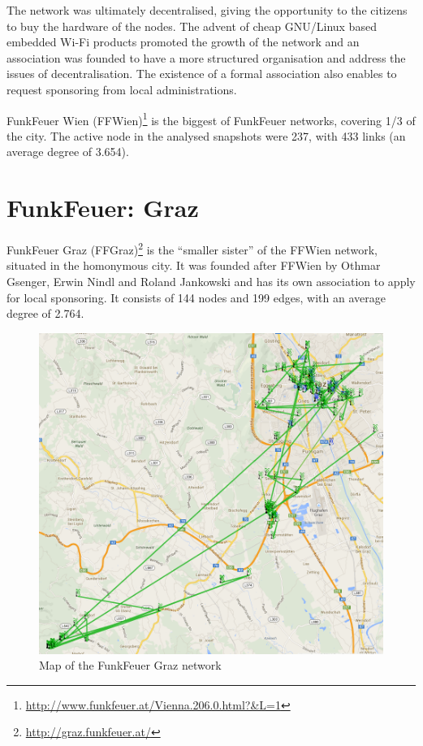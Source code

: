\documentclass[a4paper,11pt,twoside,openleft]{memoir}
\begin{document}
The network was ultimately decentralised, giving the opportunity to the
citizens to buy the hardware of the nodes. The advent of cheap GNU/Linux
based embedded Wi-Fi products promoted the growth of the network and an
association was founded to have a more structured organisation and
address the issues of decentralisation. The existence of a formal
association also enables to request sponsoring from local
administrations.

FunkFeuer Wien (FFWien)\footnote{\url{http://www.funkfeuer.at/Vienna.206.0.html?\&L=1}}
is the biggest of FunkFeuer networks, covering 1/3 of the city. The
active node in the analysed snapshots were 237, with 433 links (an
average degree of 3.654).

\section{FunkFeuer: Graz}\label{funkfeuer-graz}

FunkFeuer Graz (FFGraz)\footnote{\url{http://graz.funkfeuer.at/}} is the
``smaller sister'' of the FFWien network, situated in the homonymous
city. It was founded after FFWien by Othmar Gsenger, Erwin Nindl and
Roland Jankowski and has its own association to apply for local
sponsoring. It consists of 144 nodes and 199 edges, with an average
degree of 2.764. 

\begin{figure}[!htb]
  \centering
  \includegraphics{images/graz_map.png}
  \caption{Map of the FunkFeuer Graz network}
\end{figure}
\end{document}

